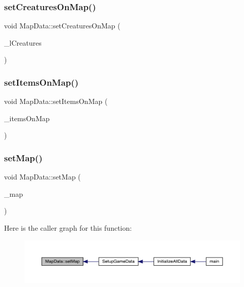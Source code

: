\subsubsection{\texorpdfstring{set\+Creatures\+On\+Map()}{setCreaturesOnMap()}}
{\footnotesize\ttfamily void Map\+Data\+::set\+Creatures\+On\+Map (\begin{DoxyParamCaption}\item[{std\+::list$<$ \mbox{\hyperlink{class_base_creature}{Base\+Creature}} $>$}]{\+\_\+l\+Creatures }\end{DoxyParamCaption})}

\mbox{\label{class_map_data_a44e4f889a01270765db90de0ebb62aa5}} 
\subsubsection{\texorpdfstring{set\+Items\+On\+Map()}{setItemsOnMap()}}
{\footnotesize\ttfamily void Map\+Data\+::set\+Items\+On\+Map (\begin{DoxyParamCaption}\item[{std\+::list$<$ \mbox{\hyperlink{class_item}{Item}} $\ast$$>$}]{\+\_\+items\+On\+Map }\end{DoxyParamCaption})}

\mbox{\label{class_map_data_a8adfe57c9e74b6e306540dcb003feb95}} 
\subsubsection{\texorpdfstring{set\+Map()}{setMap()}}
{\footnotesize\ttfamily void Map\+Data\+::set\+Map (\begin{DoxyParamCaption}\item[{\mbox{\hyperlink{class_map}{Map}} $\ast$}]{\+\_\+map }\end{DoxyParamCaption})}

Here is the caller graph for this function\+:
\nopagebreak
\begin{figure}[H]
\begin{center}
\leavevmode
\includegraphics[width=350pt]{de/d83/class_map_data_a8adfe57c9e74b6e306540dcb003feb95_icgraph}
\end{center}
\end{figure}
\mbox{\label{class_map_data_a2c65f950748fe264276e292f8a5b92f5}} 
